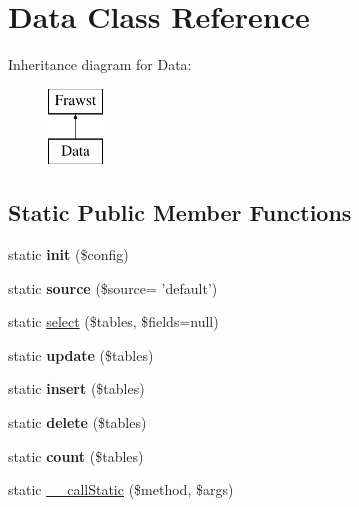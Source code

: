\hypertarget{classData}{
\section{Data Class Reference}
\label{classData}
}
Inheritance diagram for Data:\begin{figure}[H]
\begin{center}
\leavevmode
\includegraphics[height=2.000000cm]{classData}
\end{center}
\end{figure}
\subsection*{Static Public Member Functions}
\begin{DoxyCompactItemize}
\item 
\hypertarget{classData_a6df43540e03297886577f96f967833c1}{
static {\bfseries init} (\$config)}
\label{classData_a6df43540e03297886577f96f967833c1}

\item 
\hypertarget{classData_a94615039db4d7073b53274672fb6a688}{
static {\bfseries source} (\$source= 'default')}
\label{classData_a94615039db4d7073b53274672fb6a688}

\item 
static \hyperlink{classData_aacab6ce4c2e344b408a465a1d92e48a9}{select} (\$tables, \$fields=null)
\item 
\hypertarget{classData_ab93cf01ee51c9c5a1bf7ec3889070db4}{
static {\bfseries update} (\$tables)}
\label{classData_ab93cf01ee51c9c5a1bf7ec3889070db4}

\item 
\hypertarget{classData_a5624b5ebff906fb1302535e8752e513d}{
static {\bfseries insert} (\$tables)}
\label{classData_a5624b5ebff906fb1302535e8752e513d}

\item 
\hypertarget{classData_a419f1bbe488e4b41c355550b138fd320}{
static {\bfseries delete} (\$tables)}
\label{classData_a419f1bbe488e4b41c355550b138fd320}

\item 
\hypertarget{classData_a151022d2fd3bbd45b888d74a7ac7b622}{
static {\bfseries count} (\$tables)}
\label{classData_a151022d2fd3bbd45b888d74a7ac7b622}

\item 
static \hyperlink{classData_a87f7249e474e744e934aa6c82dda0906}{\_\-\_\-callStatic} (\$method, \$args)
\end{DoxyCompactItemize}
